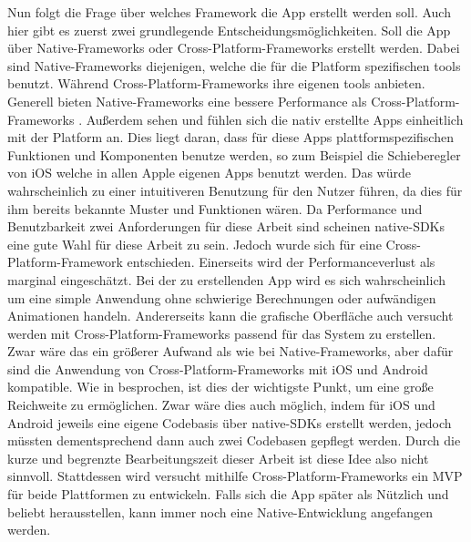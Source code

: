 \myNewSection
Nun folgt die Frage über welches Framework die App erstellt werden soll.
Auch hier gibt es zuerst zwei grundlegende Entscheidungsmöglichkeiten. Soll die App über Native-Frameworks oder Cross-Platform-Frameworks erstellt werden. Dabei sind Native-Frameworks diejenigen, welche die für die Platform spezifischen tools benutzt. Während Cross-Platform-Frameworks ihre eigenen tools anbieten.\newline
	Generell bieten Native-Frameworks eine bessere Performance als Cross-Platform-Frameworks \cite{tech_performanceReactNativeVsFlutter1, tech_performanceReactNativeVsFlutter2}.
	Außerdem sehen und fühlen sich die nativ erstellte Apps einheitlich mit der Platform an. Dies liegt daran, dass für diese Apps plattformspezifischen Funktionen und Komponenten benutze werden, so zum Beispiel die Schieberegler von iOS welche in allen Apple eigenen Apps benutzt werden. Das würde wahrscheinlich zu einer intuitiveren Benutzung für den Nutzer führen, da dies für ihm bereits bekannte Muster und Funktionen wären.\newline
		Da Performance und Benutzbarkeit zwei Anforderungen für diese Arbeit sind scheinen native-SDKs eine gute Wahl für diese Arbeit zu sein.\newline
	Jedoch wurde sich für eine Cross-Platform-Framework entschieden. 
		Einerseits wird der Performanceverlust als marginal eingeschätzt. Bei der zu erstellenden App wird es sich wahrscheinlich um eine simple Anwendung ohne schwierige Berechnungen oder aufwändigen Animationen handeln. 
		Andererseits kann die grafische Oberfläche auch versucht werden mit Cross-Platform-Frameworks passend für das System zu erstellen. Zwar wäre das ein größerer Aufwand als wie bei Native-Frameworks,
		aber dafür sind die Anwendung von Cross-Platform-Frameworks mit iOS und Android kompatible. Wie in  besprochen, ist dies der wichtigste Punkt, um eine große Reichweite zu ermöglichen. Zwar wäre dies auch möglich, indem für iOS und Android jeweils eine eigene Codebasis über native-SDKs erstellt werden, jedoch müssten dementsprechend dann auch zwei Codebasen gepflegt werden. Durch die kurze und begrenzte Bearbeitungszeit dieser Arbeit ist diese Idee also nicht sinnvoll. Stattdessen wird versucht mithilfe Cross-Platform-Frameworks ein MVP für beide Plattformen zu entwickeln. Falls sich die App später als Nützlich und beliebt herausstellen, kann immer noch eine Native-Entwicklung angefangen werden.
	
